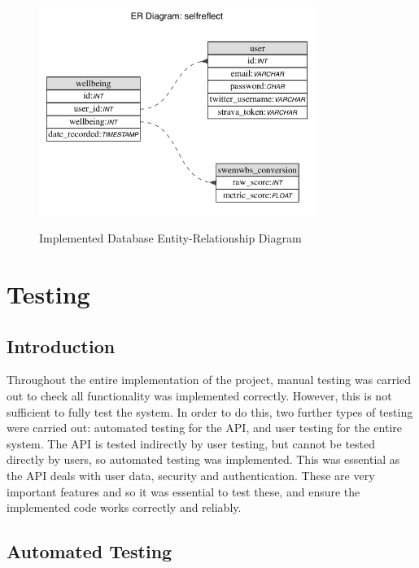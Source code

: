 \documentclass[11pt,openright,a4paper]{report}
\begin{document}
\begin{figure}[ht]
\centering
\caption{Implemented Database Entity-Relationship Diagram}
\includegraphics[width=0.8\textwidth]{i/dberdimpl.png}
\label{fig:dberdimpl}
\end{figure}

\chapter{Testing}
\section{Introduction}
Throughout the entire implementation of the project, manual testing was carried out to check all functionality was implemented correctly. However, this is not sufficient to fully test the system. In order to do this, two further types of testing were carried out: automated testing for the API, and user testing for the entire system. The API is tested indirectly by user testing, but cannot be tested directly by users, so automated testing was implemented. This was essential as the API deals with user data, security and authentication. These are very important features and so it was essential to test these, and ensure the implemented code works correctly and reliably.

\section{Automated Testing}
\end{document}
